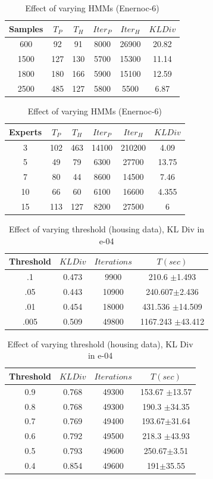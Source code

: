 \documentclass{acm_proc_article-sp}
\begin{document}
\begin{table}[htdp]
\parbox{.4\linewidth}{
\centering
\begin{tabular}{| c | c | c | c | c | c |}
\hline
Samples & $T_{P}$ & $T_H$ & $Iter_P$ & $Iter_H$ & $KL Div $\\
\hline
600 & 92 & 91 & 8000 & 26900 & 20.82 \\
1500 & 127 & 130 & 5700 & 15300 & 11.14  \\
1800 & 180 & 166 & 5900 & 15100 & 12.59 \\
2500 & 485 & 127 & 5800 & 5500 & 6.87 \\
\hline
\end{tabular}
\caption{Effect of varying samples (Enernoc-6)}
\label{table:sample3}}
\hfill
\parbox{.65\linewidth}{
\centering
\begin{tabular}{| c | c | c | c | c | c |}
\hline
Experts & $T_P$ & $T_H$ & $Iter_P$& $Iter_H$ & $KL Div $\\
\hline
3 & 102 & 463 & 14100 & 210200 & 4.09 \\
5 & 49 & 79 & 6300 & 27700 & 13.75  \\
7 & 80 & 44 & 8600 & 14500 & 7.46 \\
10 & 66 & 60 & 6100 & 16600 & 4.355  \\
15 & 113 & 127 & 8200 & 27500 & 6  \\
\hline
\end{tabular}
\caption{Effect of varying HMMs (Enernoc-6)}
\label{table:expert2}}
\end{table}

\begin{table}[htdp]
\parbox{.39\linewidth}{
\centering
\begin{tabular}{| c | c | c | c |}
\hline
Threshold & $KL Div$ & $Iterations$ & $T(sec)$  \\
\hline
.1 & 0.473 & 9900 & 210.6 $\pm$1.493 \\
.05 & 0.443 & 10900 & 240.607$\pm$2.436 \\
.01 & 0.454 & 18000 & 431.536 $\pm$14.509 \\
.005 & 0.509 & 49800 & 1167.243 $\pm$43.412 \\
\hline
\end{tabular}
\caption{Effect of varying threshold (REDD)}
\label{table:threshold1}
}
\hfill
\parbox{.65\linewidth}{
\centering
\begin{tabular}{| c | c | c | c |}
\hline
Threshold & $KL Div$ & $Iterations$& $T(sec)$ \\
\hline
0.9 & 0.768 & 49300 & 153.67 $\pm$13.57  \\
0.8 & 0.768 & 49300 & 190.3 $\pm$34.35 \\
0.7 & 0.769 & 49400 &  193.67$\pm$31.64  \\
0.6 & 0.792 & 49500 & 218.3 $\pm$43.93  \\
0.5 & 0.793 & 49600 & 250.67$\pm$3.51  \\
0.4 & 0.854 & 49600 & 191$\pm$35.55  \\
\hline
\end{tabular}
\caption{Effect of varying threshold (housing data), KL Div in e-04}
\label{table:threshold2}
}
\end{table}
\end{document}
